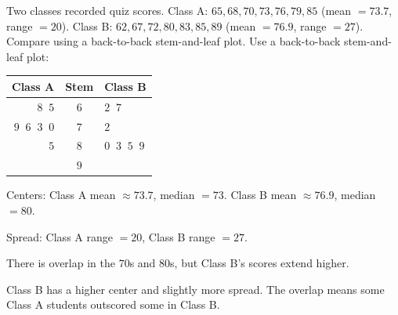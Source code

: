 \begin{stepExample}{Two classes recorded quiz scores. Class A: $65, 68, 70, 73, 76, 79, 85$ (mean $= 73.7$, range $= 20$). Class B: $62, 67, 72, 80, 83, 85, 89$ (mean $= 76.9$, range $= 27$). Compare using a back-to-back stem-and-leaf plot.}
     Use a back-to-back stem-and-leaf plot:
    \begin{center}
    \begin{tabular}{r|c|l}
        \textbf{Class A} & \textbf{Stem} & \textbf{Class B} \\
        \hline
        $8\;\;5$ & $6$ & $2\;\;7$ \\
        $9\;\;6\;\;3\;\;0$ & $7$ & $2$ \\
        $5$ & $8$ & $0\;\;3\;\;5\;\;9$ \\
         & $9$ &
    \end{tabular}
    \end{center}

     Centers: Class A mean $\approx 73.7$, median $= 73$. Class B mean $\approx 76.9$, median $= 80$.

     Spread: Class A range $= 20$, Class B range $= 27$.

     There is overlap in the $70$s and $80$s, but Class B's scores extend higher.

     Class B has a higher center and slightly more spread. The overlap means some Class A students outscored some in Class B.
\end{stepExample}


